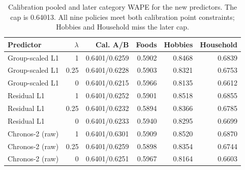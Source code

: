 \begin{table}[htbp]\centering\small
\caption{Calibration pooled and later category WAPE for the new predictors. The cap is 0.64013. All nine policies meet both calibration point constraints; Hobbies and Household miss the later cap.}
\label{tab:accuracy-groups}
\begin{tabular}{lrrrrr}\toprule
Predictor & $\lambda$ & Cal. A/B & Foods & Hobbies & Household\\\midrule
Group-scaled L1 & 1 & 0.6401/0.6259 & 0.5902 & 0.8468 & 0.6839 \\
Group-scaled L1 & 0.25 & 0.6401/0.6228 & 0.5903 & 0.8321 & 0.6753 \\
Group-scaled L1 & 0 & 0.6401/0.6215 & 0.5966 & 0.8135 & 0.6612 \\
Residual L1 & 1 & 0.6401/0.6252 & 0.5901 & 0.8518 & 0.6855 \\
Residual L1 & 0.25 & 0.6401/0.6232 & 0.5894 & 0.8366 & 0.6785 \\
Residual L1 & 0 & 0.6401/0.6233 & 0.5940 & 0.8295 & 0.6699 \\
Chronos-2 (raw) & 1 & 0.6401/0.6301 & 0.5909 & 0.8520 & 0.6870 \\
Chronos-2 (raw) & 0.25 & 0.6401/0.6259 & 0.5898 & 0.8354 & 0.6744 \\
Chronos-2 (raw) & 0 & 0.6401/0.6251 & 0.5967 & 0.8164 & 0.6603 \\\bottomrule\end{tabular}\end{table}
